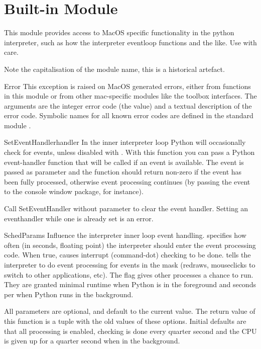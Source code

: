 \section{Built-in Module }
\label{module-MacOS}


This module provides access to MacOS specific functionality in the
python interpreter, such as how the interpreter eventloop functions
and the like. Use with care.

Note the capitalisation of the module name, this is a historical
artefact.

\begin{excdesc}{Error}
This exception is raised on MacOS generated errors, either from
functions in this module or from other mac-specific modules like the
toolbox interfaces. The arguments are the integer error code (the
 value) and a textual description of the error code.
Symbolic names for all known error codes are defined in the standard
module .
\end{excdesc}

\begin{funcdesc}{SetEventHandler}{handler}
In the inner interpreter loop Python will occasionally check for events,
unless disabled with . With this function you
can pass a Python event-handler function that will be called if an event
is available. The event is passed as parameter and the function should return
non-zero if the event has been fully processed, otherwise event processing
continues (by passing the event to the console window package, for instance).

Call SetEventHandler without parameter to clear the event handler. Setting
an eventhandler while one is already set is an error.
\end{funcdesc}

\begin{funcdesc}{SchedParams}{}
Influence the interpreter inner loop event handling. 
specifies how often (in seconds, floating point) the interpreter
should enter the event processing code. When true,  causes
interrupt (command-dot) checking to be done.  tells the
interpreter to do event processing for events in the mask (redraws,
mouseclicks to switch to other applications, etc). The 
flag gives other processes a chance to run. They are granted minimal
runtime when Python is in the foreground and  seconds per
 when Python runs in the background.

All parameters are optional, and default to the current value. The return
value of this function is a tuple with the old values of these options.
Initial defaults are that all processing is enabled, checking is done every
quarter second and the CPU is given up for a quarter second when in the
background.
\end{funcdesc}

